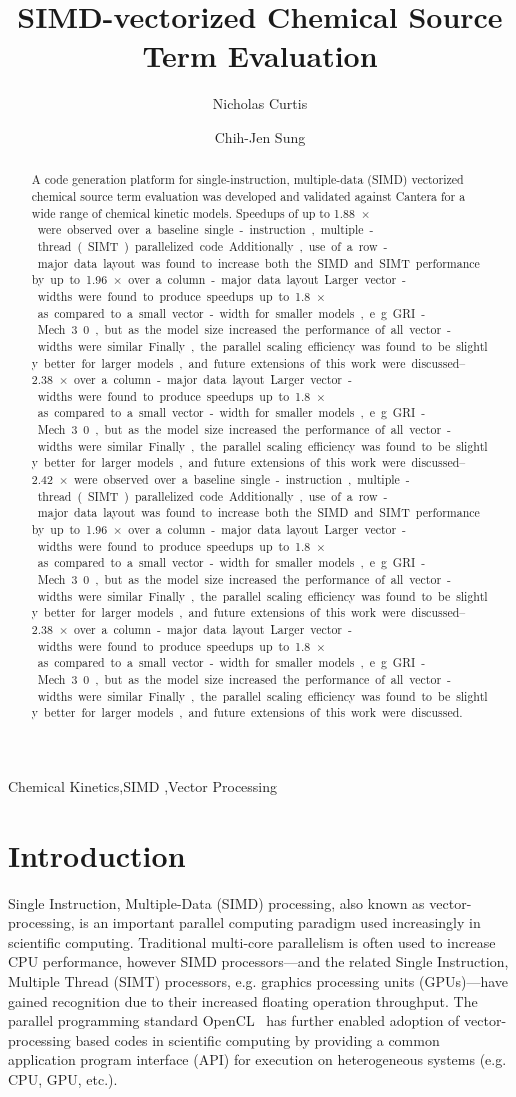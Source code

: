 \documentclass[12pt]{ussci}
\title{SIMD-vectorized Chemical Source Term Evaluation}
\author[*]{Nicholas Curtis}
\author[ ]{Chih-Jen Sung}
\affil[ ]{Department of Mechanical Engineering, University of Connecticut, Storrs, CT 06269, USA}
\affil[*]{Corresponding author: \email{nicholas.curtis@uconn.edu}}
\begin{document}
\maketitle

\begin{abstract} %
A code generation platform for single-instruction, multiple-data (SIMD) vectorized chemical source term evaluation was developed and validated against Cantera for a wide range of chemical kinetic models.
Speedups of up to \SIrange{1.88}{2.42}{$\times$} were observed over a baseline single-instruction, multiple-thread (SIMT) parallelized code.
Additionally, use of a row-major data layout was found to increase both the SIMD and SIMT performance by up to \SIrange{1.96}{2.38}{$\times$} over a column-major data layout.
Larger vector-widths were found to produce speedups up to \SI{1.8}{$\times$} as compared to a small vector-width for smaller models, e.g. GRI-Mech 3.0, but as the model size increased the performance of all vector-widths were similar.
Finally, the parallel scaling efficiency was found to be slightly better for larger models, and future extensions of this work were discussed.
\end{abstract}

\begin{keyword}
    Chemical Kinetics\sep SIMD \sep Vector Processing
\end{keyword}

\section{Introduction}
%

Single Instruction, Multiple-Data (SIMD) processing, also known as vector-processing, is an important parallel computing paradigm used increasingly in scientific computing.
Traditional multi-core parallelism is often used to increase CPU performance, however SIMD processors---and the related Single Instruction, Multiple Thread (SIMT) processors, e.g. graphics processing units (GPUs)---have gained recognition due to their increased floating operation throughput.
The parallel programming standard OpenCL~\cite{stone2010opencl} has further enabled adoption of vector-processing based codes in scientific computing by providing a common application program interface (API) for execution on heterogeneous systems (e.g. CPU, GPU, etc.).
\end{document}
